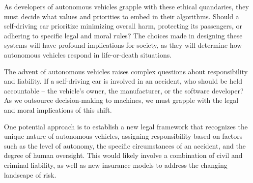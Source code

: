 As developers of autonomous vehicles grapple with these ethical quandaries, they must decide what values and priorities to embed in their algorithms. Should a self-driving car prioritize minimizing overall harm, protecting its passengers, or adhering to specific legal and moral rules? The choices made in designing these systems will have profound implications for society, as they will determine how autonomous vehicles respond in life-or-death situations.

The advent of autonomous vehicles raises complex questions about responsibility and liability. If a self-driving car is involved in an accident, who should be held accountable – the vehicle's owner, the manufacturer, or the software developer? As we outsource decision-making to machines, we must grapple with the legal and moral implications of this shift.

One potential approach is to establish a new legal framework that recognizes the unique nature of autonomous vehicles, assigning responsibility based on factors such as the level of autonomy, the specific circumstances of an accident, and the degree of human oversight. This would likely involve a combination of civil and criminal liability, as well as new insurance models to address the changing landscape of risk.

